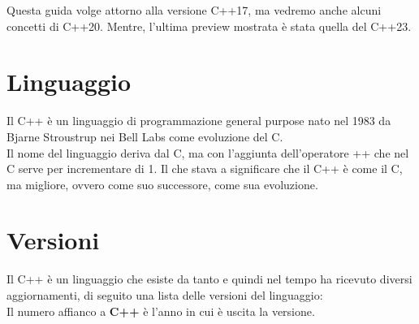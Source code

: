 \textsf{\small Questa guida volge attorno alla versione C++17, ma vedremo anche alcuni concetti di C++20.
Mentre, l'ultima preview mostrata è stata quella del C++23.}\\



\section{Linguaggio}

\textsf{\small Il C++ è un linguaggio di programmazione general purpose nato nel 1983 da Bjarne Stroustrup nei Bell Labs come evoluzione del C.}\\

\textsf{\small Il nome del linguaggio deriva dal C, ma con l'aggiunta dell'operatore ++ che nel C serve per incrementare di 1. Il che stava a significare che il C++ è come il C, ma migliore, ovvero come suo successore, come sua evoluzione.}\\


\newpage

\section{Versioni}

\textsf{\small Il C++ è un linguaggio che esiste da tanto e quindi nel tempo ha ricevuto diversi aggiornamenti, di seguito una lista delle versioni del linguaggio: }\\

\textsf{\small Il numero affianco a \textbf{C++} è l'anno in cui è uscita la versione.} \\

